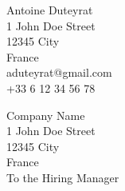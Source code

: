 
Antoine Duteyrat \\
1 John Doe Street \\
12345 City \\
France \\
aduteyrat@gmail.com \\
+33 6 12 34 56 78


\begin{flushright}
Company Name \\
1 John Doe Street \\
12345 City \\
France \\
To the Hiring Manager \\
\end{flushright}
